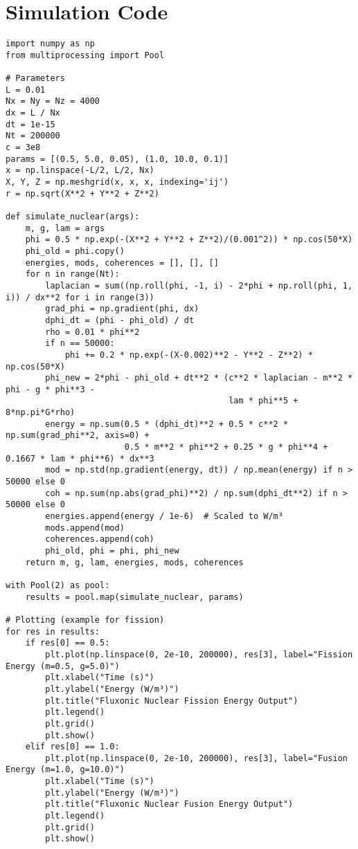 \documentclass[11pt]{article}
\begin{document}
\section{Simulation Code}
\lstset{language=Python, basicstyle=\footnotesize\ttfamily, breaklines=true, numbers=left}
\begin{lstlisting}
import numpy as np
from multiprocessing import Pool

# Parameters
L = 0.01
Nx = Ny = Nz = 4000
dx = L / Nx
dt = 1e-15
Nt = 200000
c = 3e8
params = [(0.5, 5.0, 0.05), (1.0, 10.0, 0.1)]
x = np.linspace(-L/2, L/2, Nx)
X, Y, Z = np.meshgrid(x, x, x, indexing='ij')
r = np.sqrt(X**2 + Y**2 + Z**2)

def simulate_nuclear(args):
    m, g, lam = args
    phi = 0.5 * np.exp(-(X**2 + Y**2 + Z**2)/(0.001^2)) * np.cos(50*X)
    phi_old = phi.copy()
    energies, mods, coherences = [], [], []
    for n in range(Nt):
        laplacian = sum((np.roll(phi, -1, i) - 2*phi + np.roll(phi, 1, i)) / dx**2 for i in range(3))
        grad_phi = np.gradient(phi, dx)
        dphi_dt = (phi - phi_old) / dt
        rho = 0.01 * phi**2
        if n == 50000:
            phi += 0.2 * np.exp(-(X-0.002)**2 - Y**2 - Z**2) * np.cos(50*X)
        phi_new = 2*phi - phi_old + dt**2 * (c**2 * laplacian - m**2 * phi - g * phi**3 - 
                                             lam * phi**5 + 8*np.pi*G*rho)
        energy = np.sum(0.5 * (dphi_dt)**2 + 0.5 * c**2 * np.sum(grad_phi**2, axis=0) + 
                        0.5 * m**2 * phi**2 + 0.25 * g * phi**4 + 0.1667 * lam * phi**6) * dx**3
        mod = np.std(np.gradient(energy, dt)) / np.mean(energy) if n > 50000 else 0
        coh = np.sum(np.abs(grad_phi)**2) / np.sum(dphi_dt**2) if n > 50000 else 0
        energies.append(energy / 1e-6)  # Scaled to W/m³
        mods.append(mod)
        coherences.append(coh)
        phi_old, phi = phi, phi_new
    return m, g, lam, energies, mods, coherences

with Pool(2) as pool:
    results = pool.map(simulate_nuclear, params)

# Plotting (example for fission)
for res in results:
    if res[0] == 0.5:
        plt.plot(np.linspace(0, 2e-10, 200000), res[3], label="Fission Energy (m=0.5, g=5.0)")
        plt.xlabel("Time (s)")
        plt.ylabel("Energy (W/m³)")
        plt.title("Fluxonic Nuclear Fission Energy Output")
        plt.legend()
        plt.grid()
        plt.show()
    elif res[0] == 1.0:
        plt.plot(np.linspace(0, 2e-10, 200000), res[3], label="Fusion Energy (m=1.0, g=10.0)")
        plt.xlabel("Time (s)")
        plt.ylabel("Energy (W/m³)")
        plt.title("Fluxonic Nuclear Fusion Energy Output")
        plt.legend()
        plt.grid()
        plt.show()
\end{lstlisting}
\end{document}
